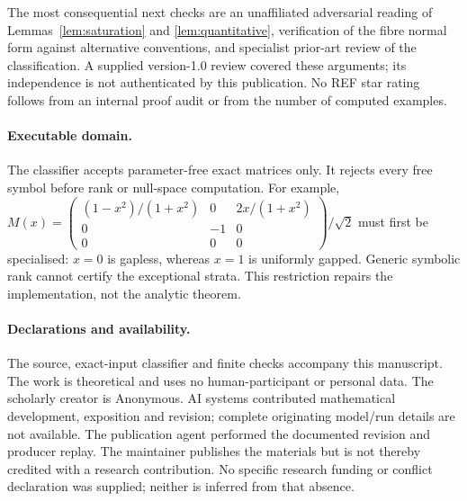 \documentclass[11pt,a4paper]{article}
\theoremstyle{remark}\newtheorem{remark}[theorem]{Remark}
\begin{document}
The most consequential next checks are an unaffiliated adversarial reading of Lemmas~\ref{lem:saturation} and \ref{lem:quantitative}, verification of the fibre normal form against alternative conventions, and specialist prior-art review of the classification. A supplied version-1.0 review covered these arguments; its independence is not authenticated by this publication. No REF star rating follows from an internal proof audit or from the number of computed examples.

\paragraph{Executable domain.}
The classifier accepts parameter-free exact matrices only. It rejects every
free symbol before rank or null-space computation. For example,
$M(x)=\left(\begin{smallmatrix}(1-x^2)/(1+x^2)&0&2x/(1+x^2)\\0&-1&0\\0&0&0\end{smallmatrix}\right)/\sqrt2$
must first be specialised: $x=0$ is gapless, whereas $x=1$ is uniformly
gapped. Generic symbolic rank cannot certify the exceptional strata.
This restriction repairs the implementation, not the analytic theorem.

\paragraph{Declarations and availability.}
The source, exact-input classifier and finite checks accompany this manuscript.
The work is theoretical and uses no human-participant or personal data.
The scholarly creator is Anonymous. AI systems contributed mathematical
development, exposition and revision; complete originating model/run details
are not available. The publication agent performed the documented revision
and producer replay. The maintainer publishes the materials but is not thereby
credited with a research contribution. No specific research funding or
conflict declaration was supplied; neither is inferred from that absence.

\appendix
\end{document}
